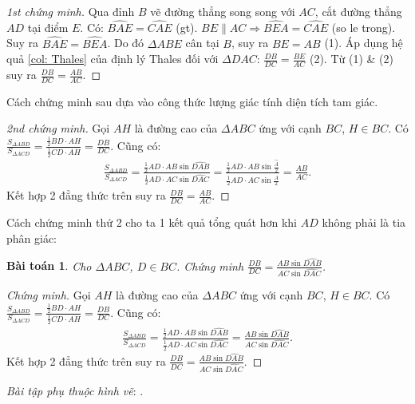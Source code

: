 \documentclass{article}
\newtheorem{baitoan}{Bài toán}
\begin{document}
\begin{proof}[1st chứng minh]
	Qua đỉnh $B$ vẽ đường thẳng song song với $AC$, cắt đường thẳng $AD$ tại điểm $E$. Có: $\widehat{BAE} = \widehat{CAE}$ (gt). $BE\parallel AC\Rightarrow\widehat{BEA} = \widehat{CAE}$ (so le trong). Suy ra $\widehat{BAE} = \widehat{BEA}$. Do đó $\Delta ABE$ cân tại $B$, suy ra $BE = AB$ (1). Áp dụng hệ quả \ref{col: Thales} của định lý Thales đối với $\Delta DAC$: $\frac{DB}{DC} = \frac{BE}{AC}$ (2). Từ (1) \& (2) suy ra $\frac{DB}{DC} = \frac{AB}{AC}$.
\end{proof}
Cách chứng minh sau dựa vào công thức lượng giác tính diện tích tam giác.
\begin{proof}[2nd chứng minh]
	Gọi $AH$ là đường cao của $\Delta ABC$ ứng với cạnh $BC$, $H\in BC$. Có $\frac{S_{\Delta ABD}}{S_{\Delta ACD}} = \frac{\frac{1}{2}BD\cdot AH}{\frac{1}{2}CD\cdot AH} = \frac{DB}{DC}$. Cũng có:
	\begin{align*}
		\frac{S_{\Delta ABD}}{S_{\Delta ACD}} = \frac{\frac{1}{2}AD\cdot AB\sin\widehat{DAB}}{\frac{1}{2}AD\cdot AC\sin\widehat{DAC}} = \frac{\frac{1}{2}AD\cdot AB\sin\frac{\widehat{A}}{2}}{\frac{1}{2}AD\cdot AC\sin\frac{\widehat{A}}{2}} = \frac{AB}{AC}.
	\end{align*}
	Kết hợp 2 đẳng thức trên suy ra $\frac{DB}{DC} = \frac{AB}{AC}$.
\end{proof}
Cách chứng minh thứ 2 cho ta 1 kết quả tổng quát hơn khi $AD$ không phải là tia phân giác:

\begin{baitoan}
	Cho $\Delta ABC$, $D\in BC$. Chứng minh $\frac{DB}{DC} = \frac{AB\sin\widehat{DAB}}{AC\sin\widehat{DAC}}$.
\end{baitoan}

\begin{proof}[Chứng minh]
	Gọi $AH$ là đường cao của $\Delta ABC$ ứng với cạnh $BC$, $H\in BC$. Có $\frac{S_{\Delta ABD}}{S_{\Delta ACD}} = \frac{\frac{1}{2}BD\cdot AH}{\frac{1}{2}CD\cdot AH} = \frac{DB}{DC}$. Cũng có:
	\begin{align*}
		\frac{S_{\Delta ABD}}{S_{\Delta ACD}} = \frac{\frac{1}{2}AD\cdot AB\sin\widehat{DAB}}{\frac{1}{2}AD\cdot AC\sin\widehat{DAC}} = \frac{AB\sin\widehat{DAB}}{AC\sin\widehat{DAC}}.
	\end{align*}
	Kết hợp 2 đẳng thức trên suy ra $\frac{DB}{DC} = \frac{AB\sin\widehat{DAB}}{AC\sin\widehat{DAC}}$.
\end{proof}
\noindent\textit{Bài tập phụ thuộc hình vẽ}: \cite[?2--?3, 15. p. 67]{SGK_Toan_8_tap_2}.
\end{document}
